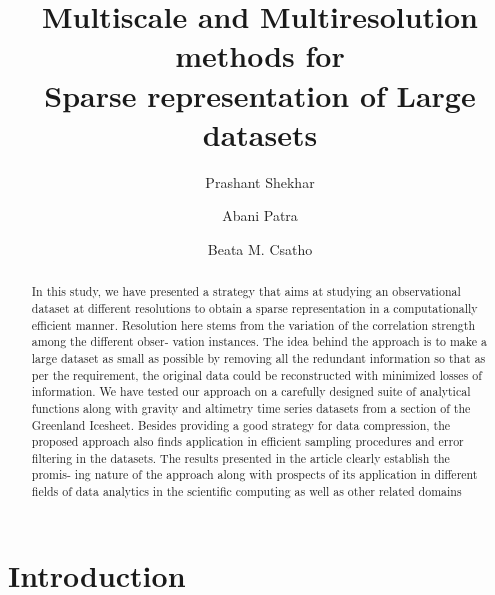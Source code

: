 \documentclass[procedia]{easychair}
\title{Multiscale and Multiresolution methods for  \\
Sparse representation of Large datasets  }
\author{
    Prashant Shekhar\inst{}%
\and
    Abani Patra\inst{}%
\and 
    Beata M. Csatho
\\
}
\institute{
  State University of New York at Buffalo, New York, U.S.A\\
  \email{pshekhar@buffalo.edu, abani@buffalo.edu, bcsatho@buffalo.edu}
 }
\begin{document}
\maketitle


\begin{abstract}
In this study, we have presented a strategy that aims at studying an observational dataset at different resolutions to obtain a sparse representation in a computationally efficient manner. Resolution here stems from the variation of the correlation strength among the different obser- vation instances. The idea behind the approach is to make a large dataset as small as possible by removing all the redundant information so that as per the requirement, the original data could be reconstructed with minimized losses of information. We have tested our approach on a carefully designed suite of analytical functions along with gravity and altimetry time series datasets from a section of the Greenland Icesheet. Besides providing a good strategy for data compression, the proposed approach also finds application in efficient sampling procedures and error filtering in the datasets. The results presented in the article clearly establish the promis- ing nature of the approach along with prospects of its application in different fields of data analytics in the scientific computing as well as other related domains
\end{abstract}


%
%


\section{Introduction}
\label{sect:introduction}
\end{document}
